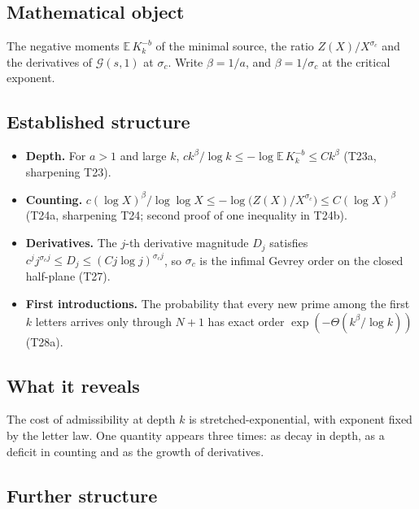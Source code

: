 \documentclass[
  11pt,
]{article}
\providecommand{\tightlist}{%
  \setlength{\itemsep}{0pt}\setlength{\parskip}{0pt}}
\begin{document}
\hypertarget{mathematical-object-3}{%
\subsection{Mathematical object}\label{mathematical-object-3}}

The negative moments \(\mathbb E\,K_k^{-b}\) of the minimal source, the
ratio \(Z(X)/X^{\sigma_c}\) and the derivatives of \(\mathcal G(s,1)\)
at \(\sigma_c\). Write \(\beta=1/a\), and \(\beta=1/\sigma_c\) at the
critical exponent.

\hypertarget{established-structure-3}{%
\subsection{Established structure}\label{established-structure-3}}

\begin{itemize}
\tightlist
\item
  \textbf{Depth.} For \(a>1\) and large \(k\),
  \(ck^{\beta}/\log k\le-\log\mathbb E\,K_k^{-b}\le Ck^{\beta}\) (T23a,
  sharpening T23).
\item
  \textbf{Counting.}
  \(c(\log X)^{\beta}/\log\log X\le-\log\big(Z(X)/X^{\sigma_c}\big)\le C(\log X)^{\beta}\)
  (T24a, sharpening T24; second proof of one inequality in T24b).
\item
  \textbf{Derivatives.} The \(j\)-th derivative magnitude \(D_j\)
  satisfies \(c^jj^{\sigma_cj}\le D_j\le(Cj\log j)^{\sigma_cj}\), so
  \(\sigma_c\) is the infimal Gevrey order on the closed half-plane
  (T27).
\item
  \textbf{First introductions.} The probability that every new prime
  among the first \(k\) letters arrives only through \(N+1\) has exact
  order \(\exp(-\Theta(k^{\beta}/\log k))\) (T28a).
\end{itemize}

\hypertarget{what-it-reveals-3}{%
\subsection{What it reveals}\label{what-it-reveals-3}}

The cost of admissibility at depth \(k\) is stretched-exponential, with
exponent fixed by the letter law. One quantity appears three times: as
decay in depth, as a deficit in counting and as the growth of
derivatives.

\hypertarget{further-structure-3}{%
\subsection{Further structure}\label{further-structure-3}}
\end{document}
